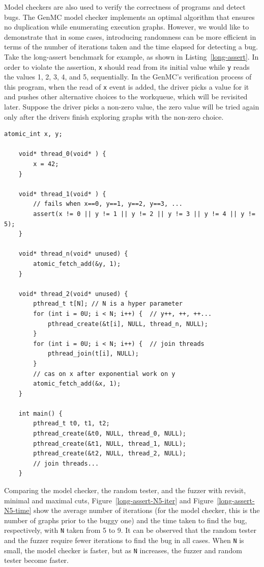 Model checkers are also used to verify the correctness of programs and detect bugs. The GenMC model checker implements an optimal algorithm that ensures no duplication while enumerating execution graphs. However, we would like to demonstrate that in some cases, introducing randomness can be more efficient in terms of the number of iterations taken and the time elapsed for detecting a bug. Take the long-assert benchmark for example, as shown in Listing~\ref{long-assert}. In order to violate the assertion, \texttt{x} should read from its initial value while \texttt{y} reads the values 1, 2, 3, 4, and 5, sequentially. In the GenMC's verification process of this program, when the read of \texttt{x} event is added, the driver picks a value for it and pushes other alternative choices to the workqueue, which will be revisited later. Suppose the driver picks a non-zero value, the zero value will be tried again only after the drivers finish exploring graphs with the non-zero choice.


\begin{lstlisting}[caption={long-assert}, label={long-assert}]
	atomic_int x, y;

	void* thread_0(void* ) {
		x = 42;
	}

	void* thread_1(void* ) {
		// fails when x==0, y==1, y==2, y==3, ...
		assert(x != 0 || y != 1 || y != 2 || y != 3 || y != 4 || y != 5);  
	}

	void* thread_n(void* unused) {
		atomic_fetch_add(&y, 1);
	}

	void* thread_2(void* unused) {
		pthread_t t[N];	// N is a hyper parameter
		for (int i = 0U; i < N; i++) {	// y++, ++, ++...
			pthread_create(&t[i], NULL, thread_n, NULL);
		}			
		for (int i = 0U; i < N; i++) {	// join threads
			pthread_join(t[i], NULL);
		}			
		// cas on x after exponential work on y
		atomic_fetch_add(&x, 1);
	}

	int main() {
		pthread_t t0, t1, t2;
		pthread_create(&t0, NULL, thread_0, NULL);
		pthread_create(&t1, NULL, thread_1, NULL);
		pthread_create(&t2, NULL, thread_2, NULL);
		// join threads...
	}

\end{lstlisting}

Comparing the model checker, the random tester, and the fuzzer with revisit, minimal and maximal cuts, Figure~\ref{long-assert-N5-iter} and Figure~\ref{long-assert-N5-time} show the average number of iterations (for the model checker, this is the number of graphs prior to the buggy one) and the time taken to find the bug, respectively, with \texttt{N} taken from 5 to 9. It can be observed that the random tester and the fuzzer require fewer iterations to find the bug in all cases. When \texttt{N} is small, the model checker is faster, but as \texttt{N} increases, the fuzzer and random tester become faster.

